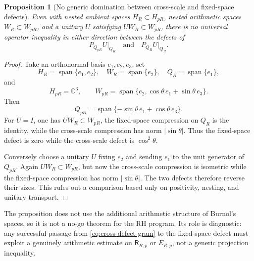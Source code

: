 \documentclass[11pt]{article}
\newtheorem{proposition}[theorem]{Proposition}
\theoremstyle{remark}
\begin{document}
\begin{proposition}[No generic domination between cross-scale and fixed-space defects]\label{prop:no-domination}
Even with nested ambient spaces $H_R\subset H_{pR}$, nested arithmetic spaces $W_R\subset W_{pR}$, and a unitary $U$ satisfying $UW_R\subset W_{pR}$, there is no universal operator inequality in either direction between the defects of
\[
 P_{Q_{pR}}U\big|_{Q_R}
 \quad\text{and}\quad
 P_{Q_R}U\big|_{Q_R}.
\]
\end{proposition}
\begin{proof}
Take an orthonormal basis $e_1,e_2,e_3$, set
\[
 H_R=\operatorname{span}\{e_1,e_2\},\quad W_R=\operatorname{span}\{e_2\},\quad Q_R=\operatorname{span}\{e_1\},
\]
and
\[
 H_{pR}=\mathbb C^3,\qquad
 W_{pR}=\operatorname{span}\{e_2,\cos\theta\,e_1+\sin\theta\,e_3\}.
\]
Then
\[
 Q_{pR}=\operatorname{span}\{-\sin\theta\,e_1+\cos\theta\,e_3\}.
\]
For $U=I$, one has $UW_R\subset W_{pR}$, the fixed-space compression on $Q_R$ is the identity, while the cross-scale compression has norm $|\sin\theta|$.  Thus the fixed-space defect is zero while the cross-scale defect is $\cos^2\theta$.

Conversely choose a unitary $U$ fixing $e_2$ and sending $e_1$ to the unit generator of $Q_{pR}$.  Again $UW_R\subset W_{pR}$, but now the cross-scale compression is isometric while the fixed-space compression has norm $|\sin\theta|$.  The two defects therefore reverse their sizes.  This rules out a comparison based only on positivity, nesting, and unitary transport.
\end{proof}

The proposition does not use the additional arithmetic structure of Burnol's spaces, so it is not a no-go theorem for the RH program.  Its role is diagnostic: any successful passage from \eqref{eq:cross-defect-gram} to the fixed-space defect must exploit a genuinely arithmetic estimate on $\mathsf R_{R,p}$ or $E_{R,p}$, not a generic projection inequality.
\end{document}
